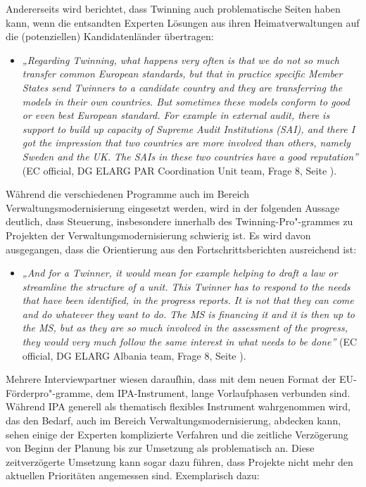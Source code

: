 Andererseits wird berichtet, dass Twinning auch problematische Seiten haben kann, wenn die entsandten Experten Lösungen aus ihren Heimatverwaltungen auf die (potenziellen) Kandidatenländer übertragen:
\begin{itemize}[label={}]
\item \textit{„Regarding Twinning, what happens very often is that we do not so much transfer common European standards, but that in practice specific Member States send Twinners to a candidate country and they are transferring the models in their own countries. But sometimes these models conform to good or even best European standard. For example in external audit, there is support to build up capacity of Supreme Audit Institutions (SAI), and there I got the impression that two countries are more involved than others, namely Sweden and the UK. The SAIs in these two countries have a good reputation”} (EC official, DG ELARG PAR Coordination Unit team, Frage 8, Seite \pageref{sec:relevant}).
\end{itemize}
Während die verschiedenen Programme auch im Bereich Verwaltungsmodernisierung eingesetzt werden, wird in der folgenden Aussage deutlich, dass Steuerung, insbesondere innerhalb des Twinning-Pro"-grammes zu Projekten der Verwaltungsmodernisierung schwierig ist. Es wird davon ausgegangen, dass die Orientierung aus den Fortschrittsberichten ausreichend ist:
\begin{itemize}[label={}]
\item \textit{„And for a Twinner, it would mean for example helping to draft a law or streamline the structure of a unit. This Twinner has to respond to the needs that have been identified, in the progress reports. It is not that they can come and do whatever they want to do. The MS is financing it and it is then up to the MS, but as they are so much involved in the assessment of the progress, they would very much follow the same interest in what needs to be done”} (EC official, DG ELARG Albania team, Frage 8, Seite \pageref{sec:relevant}).
\end{itemize}
Mehrere Interviewpartner wiesen daraufhin, dass mit dem neuen Format der EU-Förderpro"-gramme, dem IPA-Instrument, lange Vorlaufphasen verbunden sind. Während IPA generell als thematisch flexibles Instrument wahrgenommen wird, das den Bedarf, auch im Bereich Verwaltungsmodernisierung, abdecken kann, sehen einige der Experten komplizierte Verfahren und die zeitliche Verzögerung von Beginn der Planung bis zur Umsetzung als problematisch an. Diese zeitverzögerte Umsetzung kann sogar dazu führen, dass Projekte nicht mehr den aktuellen Prioritäten angemessen sind. Exemplarisch dazu:

